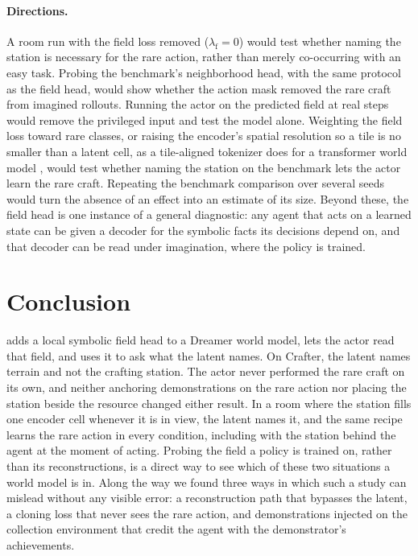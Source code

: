 \paragraph{Directions.}
A room run with the field loss removed ($\lambda_{\mathrm{f}}=0$) would test whether naming the station is necessary for the rare action, rather than merely co-occurring with an easy task.
Probing the benchmark's neighborhood head, with the same protocol as the field head, would show whether the action mask removed the rare craft from imagined rollouts.
Running the actor on the predicted field at real steps would remove the privileged input and test the model alone.
Weighting the field loss toward rare classes, or raising the encoder's spatial resolution so a tile is no smaller than a latent cell, as a tile-aligned tokenizer does for a transformer world model \citep{dedieu2025improving}, would test whether naming the station on the benchmark lets the actor learn the rare craft.
Repeating the benchmark comparison over several seeds would turn the absence of an effect into an estimate of its size.
Beyond these, the field head is one instance of a general diagnostic: any agent that acts on a learned state can be given a decoder for the symbolic facts its decisions depend on, and that decoder can be read under imagination, where the policy is trained.

\section{Conclusion}
\label{sec:conclusion}

\method{} adds a local symbolic field head to a Dreamer world model, lets the actor read that field, and uses it to ask what the latent names.
On Crafter, the latent names terrain and not the crafting station. The actor never performed the rare craft on its own, and neither anchoring demonstrations on the rare action nor placing the station beside the resource changed either result.
In a room where the station fills one encoder cell whenever it is in view, the latent names it, and the same recipe learns the rare action in every condition, including with the station behind the agent at the moment of acting.
Probing the field a policy is trained on, rather than its reconstructions, is a direct way to see which of these two situations a world model is in.
Along the way we found three ways in which such a study can mislead without any visible error: a reconstruction path that bypasses the latent, a cloning loss that never sees the rare action, and demonstrations injected on the collection environment that credit the agent with the demonstrator's achievements.
